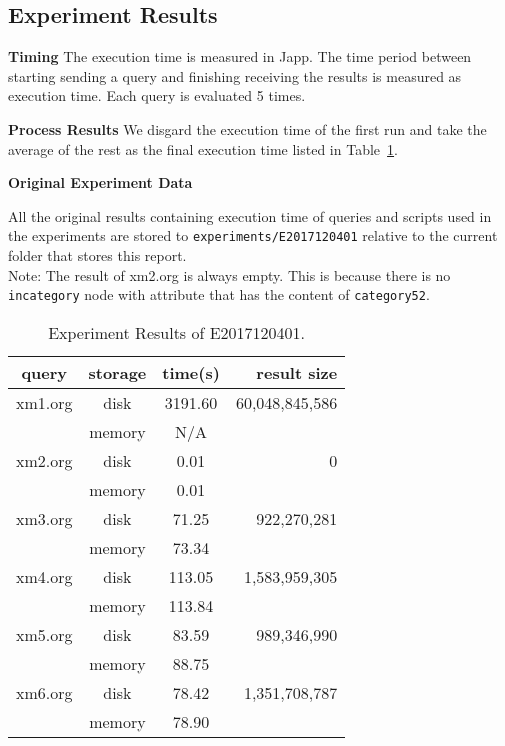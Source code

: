 \subsection{Experiment Results}

\textbf{Timing} The execution time is measured in Japp. The time period between
starting sending a query and finishing receiving the results is measured as
execution time. Each query is evaluated 5 times. 

\textbf{Process Results}
We disgard the execution time of the first run and take the average of the rest as
the final execution time listed in Table~\ref{table:E2017120401_1}.


\textbf{Original Experiment Data}

All the original results containing execution time of queries and scripts used 
in the experiments  are stored to \texttt{experiments/E2017120401} relative to
the current folder that stores this report.\\

Note: The result of xm2.org is always empty. This is because there is no \texttt{incategory} node 
with attribute that has the content of \texttt{category52}. 


\begin{table}[t]
	\caption{Experiment Results of E2017120401.}
	\label{table:E2017120401_1}
	\centering
	\begin{tabular}{c|c|c|r}
 		\hline \hline
 query  & storage & time(s)  &   result size  \\
 \hline \hline
 xm1.org &  disk   & 3191.60  & 60,048,845,586 \\
         & memory  &    N/A   &  \\
 \hline
 xm2.org &  disk   &    0.01  &              0 \\
         & memory  &    0.01  &  \\
  \hline
 xm3.org &  disk   &  71.25  &    922,270,281 \\
         & memory  &  73.34  &  \\
  \hline
 xm4.org &  disk   &  113.05  &  1,583,959,305 \\
         & memory  &  113.84  &  \\
  \hline
 xm5.org &  disk   &  83.59  &    989,346,990 \\
         & memory  &  88.75   &   \\
  \hline
 xm6.org &  disk   &  78.42   &  1,351,708,787 \\
         & memory  &  78.90   &   \\
 \hline \hline
	\end{tabular}
\end{table}





